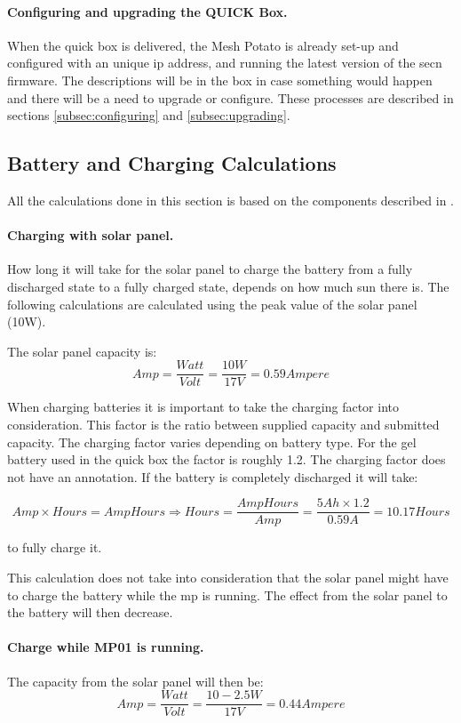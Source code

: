 \paragraph{Configuring and upgrading the QUICK Box.}
When the \gls{quick} box is delivered, the Mesh Potato is already set-up and configured with an unique \gls{ip} address, and running the latest version of the \gls{secn} firmware. The descriptions will be in the box in case something would happen and there will be a need to upgrade or configure. These processes are described in sections \ref{subsec:configuring} and \ref{subsec:upgrading}.

\subsection{Battery and Charging Calculations}
All the calculations done in this section is based on the components described in . 

\paragraph{Charging with solar panel.}
How long it will take for the solar panel to charge the battery from a fully discharged state to a fully charged state, depends on how much sun there is. The following calculations are calculated using the peak value of the solar panel (10W). 

The solar panel capacity is:
$$Amp = \frac{Watt}{Volt} = \frac{10 W}{17 V} = 0.59 Ampere$$

When charging batteries it is important to take the charging factor into consideration. This factor is the ratio between supplied capacity and submitted capacity. The charging factor varies depending on battery type. For the gel battery used in the \gls{quick} box the factor is roughly 1.2. The charging factor does not have an annotation. 
If the battery is completely discharged it will take: 

$$Amp\times Hours = AmpHours \Rightarrow Hours =\frac{AmpHours}{Amp} = \frac{5 Ah\times 1.2}{0.59 A} = 10.17 Hours$$

to fully charge it. 

This calculation does not take into consideration that the solar panel might have to charge the battery while the \gls{mp} is running. The effect from the solar panel to the battery will then decrease. 

\paragraph{Charge while MP01 is running.}
The capacity from the solar panel will then be: 
$$Amp = \frac{Watt}{Volt} = \frac{10-2.5 W}{17 V} = 0.44 Ampere$$

